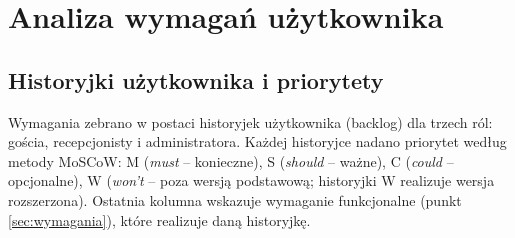 \documentclass[12pt,a4paper]{article}
\begin{document}
\section{Analiza wymagań użytkownika}

\subsection{Historyjki użytkownika i priorytety}

\noindent Wymagania zebrano w postaci historyjek użytkownika (backlog) dla trzech ról:
gościa, recepcjonisty i administratora. Każdej historyjce nadano priorytet
według metody MoSCoW: M (\emph{must} -- konieczne), S (\emph{should} --
ważne), C (\emph{could} -- opcjonalne), W (\emph{won't} -- poza wersją
podstawową; historyjki W realizuje wersja rozszerzona). Ostatnia kolumna
wskazuje wymaganie funkcjonalne (punkt \ref{sec:wymagania}), które realizuje
daną historyjkę.
\end{document}
